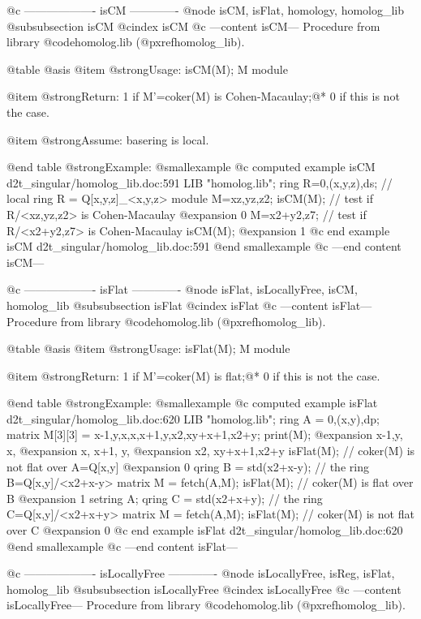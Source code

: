@c ------------------- isCM -------------
@node isCM, isFlat, homology, homolog_lib
@subsubsection isCM
@cindex isCM
@c ---content isCM---
Procedure from library @code{homolog.lib} (@pxref{homolog_lib}).

@table @asis
@item @strong{Usage:}
isCM(M); M module

@item @strong{Return:}
1 if M'=coker(M) is Cohen-Macaulay;@*
0 if this is not the case.

@item @strong{Assume:}
basering is local.

@end table
@strong{Example:}
@smallexample
@c computed example isCM d2t_singular/homolog_lib.doc:591 
LIB "homolog.lib";
ring R=0,(x,y,z),ds;  // local ring R = Q[x,y,z]_<x,y,z>
module M=xz,yz,z2;   
isCM(M);             // test if R/<xz,yz,z2> is Cohen-Macaulay
@expansion{} 0
M=x2+y2,z7;          // test if R/<x2+y2,z7> is Cohen-Macaulay
isCM(M);
@expansion{} 1
@c end example isCM d2t_singular/homolog_lib.doc:591
@end smallexample
@c ---end content isCM---

@c ------------------- isFlat -------------
@node isFlat, isLocallyFree, isCM, homolog_lib
@subsubsection isFlat
@cindex isFlat
@c ---content isFlat---
Procedure from library @code{homolog.lib} (@pxref{homolog_lib}).

@table @asis
@item @strong{Usage:}
isFlat(M); M module

@item @strong{Return:}
1 if M'=coker(M) is flat;@*
0 if this is not the case.

@end table
@strong{Example:}
@smallexample
@c computed example isFlat d2t_singular/homolog_lib.doc:620 
LIB "homolog.lib";
ring A = 0,(x,y),dp;
matrix M[3][3] = x-1,y,x,x,x+1,y,x2,xy+x+1,x2+y;
print(M);
@expansion{} x-1,y,     x,  
@expansion{} x,  x+1,   y,  
@expansion{} x2, xy+x+1,x2+y
isFlat(M);             // coker(M) is not flat over A=Q[x,y]
@expansion{} 0
qring B = std(x2+x-y);   // the ring B=Q[x,y]/<x2+x-y>
matrix M = fetch(A,M);
isFlat(M);             // coker(M) is flat over B
@expansion{} 1
setring A;
qring C = std(x2+x+y);   // the ring C=Q[x,y]/<x2+x+y>
matrix M = fetch(A,M);
isFlat(M);             // coker(M) is not flat over C
@expansion{} 0
@c end example isFlat d2t_singular/homolog_lib.doc:620
@end smallexample
@c ---end content isFlat---

@c ------------------- isLocallyFree -------------
@node isLocallyFree, isReg, isFlat, homolog_lib
@subsubsection isLocallyFree
@cindex isLocallyFree
@c ---content isLocallyFree---
Procedure from library @code{homolog.lib} (@pxref{homolog_lib}).

